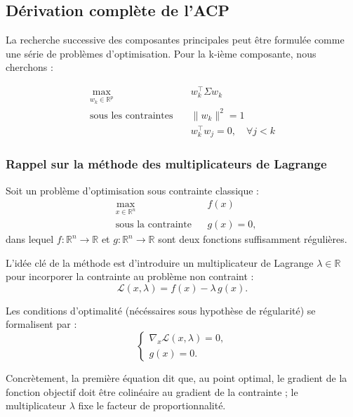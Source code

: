\documentclass[a4paper,12pt]{report}
\begin{document}
\subsection{Dérivation complète de l'ACP}

La recherche successive des composantes principales peut être formulée comme une série de problèmes d'optimisation. Pour la k-ième composante, nous cherchons :

\begin{equation}
\begin{aligned}
\max_{w_k \in \mathbb{R}^p} \quad & w_k^\top \Sigma w_k \\
\text{sous les contraintes} \quad & \|w_k\|^2 = 1 \\
& w_k^\top w_j = 0, \quad \forall j < k
\end{aligned}
\end{equation}

  
\subsubsection*{Rappel sur la méthode des multiplicateurs de Lagrange}
Soit un problème d'optimisation sous contrainte classique :
\begin{equation}
    \begin{aligned}
        & \max_{x \in \mathbb{R}^n} && f(x) \\
        & \text{sous la contrainte} && g(x) = 0,
    \end{aligned}
\end{equation}
dans lequel $f : \mathbb{R}^n \to \mathbb{R}$ et $g : \mathbb{R}^n \to \mathbb{R}$ sont deux fonctions suffisamment régulières. 

L'idée clé de la méthode est d'introduire un multiplicateur de Lagrange $\lambda \in \mathbb{R}$ pour incorporer la contrainte au problème non contraint :
\begin{equation}
    \mathcal{L}(x,\lambda) = f(x) - \lambda\, g(x).
\end{equation}

Les conditions d'optimalité (nécéssaires sous hypothèse de régularité) se formalisent par :
\begin{equation}
    \begin{cases}
        \nabla_x \mathcal{L}(x,\lambda) = 0,  \\
        g(x) = 0.
    \end{cases}
\end{equation}

Concrètement, la première équation dit que, au point optimal, le gradient de la fonction objectif doit être colinéaire au gradient de la contrainte ; le multiplicateur $\lambda$ fixe le facteur de proportionnalité.
\end{document}
